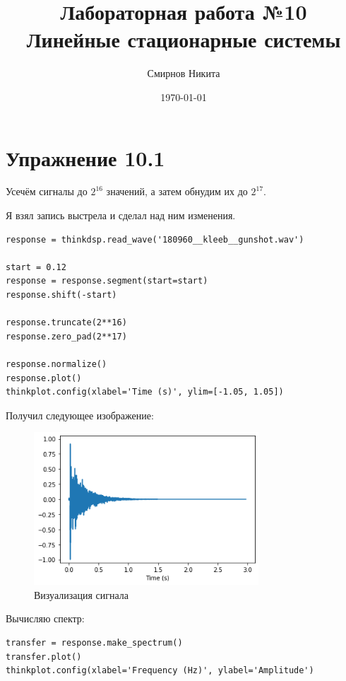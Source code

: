 \documentclass[a4paper,12pt]{report}
\title{Лабораторная работа №10\\Линейные стационарные системы}
\author{Смирнов Никита}
\date{\today}
\begin{document}
\maketitle
\tableofcontents
\listoffigures
\lstlistoflistings

\maketitle

\chapter{Упражнение 10.1}

Усечём сигналы до $2^{16}$ значений, а затем обнудим их до $2^{17}$.

Я взял запись выстрела и сделал над ним изменения.

\begin{lstlisting}[caption=Усечение сигнала]
response = thinkdsp.read_wave('180960__kleeb__gunshot.wav')

start = 0.12
response = response.segment(start=start)
response.shift(-start)

response.truncate(2**16)
response.zero_pad(2**17)

response.normalize()
response.plot()
thinkplot.config(xlabel='Time (s)', ylim=[-1.05, 1.05])
\end{lstlisting}

Получил следующее изображение:

\begin{figure}[H]
        \centering
        \includegraphics[width=0.75\textwidth]{1.png}
        \caption{Визуализация сигнала}
        \label{1}
\end{figure}

Вычисляю спектр:

\begin{lstlisting}[caption=Спектр сигнала]
transfer = response.make_spectrum()
transfer.plot()
thinkplot.config(xlabel='Frequency (Hz)', ylabel='Amplitude')
\end{lstlisting}
\end{document}
